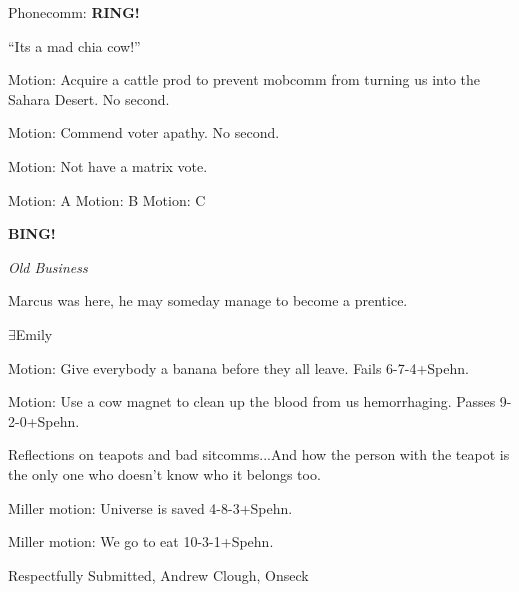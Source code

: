\documentclass[12pt]{article}
\newcommand{\bing}{{\bf BING!} }
\newcommand{\goto}[1]{\bing \vskip 12pt \centerline{{\em{#1}}}}
\begin{document}
Phonecomm:  \textbf{RING!}

``Its a mad chia cow!''

Motion:  Acquire a cattle prod to prevent mobcomm from turning us into the Sahara Desert.  No second.

Motion:  Commend voter apathy.  No second.

Motion:  Not have a matrix vote.  

Motion: A  Motion: B  Motion: C





\goto{Old Business}

Marcus was here, he may someday manage to become a prentice.

$\exists$Emily

Motion:  Give everybody a banana before they all leave.  Fails 6-7-4+Spehn.

Motion:  Use a cow magnet to clean up the blood from us hemorrhaging.  Passes 9-2-0+Spehn.

Reflections on teapots and bad sitcomms...And how the person with the teapot is the only one who doesn't know who it belongs too.

Miller motion: Universe is saved  4-8-3+Spehn.

Miller motion:  We go to eat 10-3-1+Spehn.
\vspace{18pt}
\begin{center}

Respectfully Submitted,
Andrew Clough, Onseck

\end{center}
\end{document}
